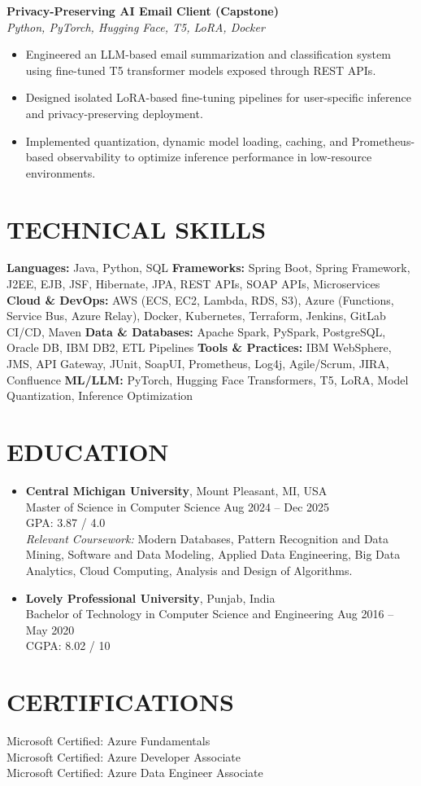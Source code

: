 \documentclass[11pt]{article}
\begin{document}
\textbf{Privacy-Preserving AI Email Client (Capstone)} \\
\textit{Python, PyTorch, Hugging Face, T5, LoRA, Docker}

\begin{itemize}
    \item Engineered an LLM-based email summarization and classification system using fine-tuned T5 transformer models exposed through REST APIs.
    \item Designed isolated LoRA-based fine-tuning pipelines for user-specific inference and privacy-preserving deployment.
    \item Implemented quantization, dynamic model loading, caching, and Prometheus-based observability to optimize inference performance in low-resource environments.
\end{itemize}

\section*{TECHNICAL SKILLS}

\textbf{Languages:} Java, Python, SQL
\textbf{Frameworks:} Spring Boot, Spring Framework, J2EE, EJB, JSF, Hibernate, JPA, REST APIs, SOAP APIs, Microservices
\textbf{Cloud \& DevOps:} AWS (ECS, EC2, Lambda, RDS, S3), Azure (Functions, Service Bus, Azure Relay), Docker, Kubernetes, Terraform, Jenkins, GitLab CI/CD, Maven
\textbf{Data \& Databases:} Apache Spark, PySpark, PostgreSQL, Oracle DB, IBM DB2, ETL Pipelines
\textbf{Tools \& Practices:} IBM WebSphere, JMS, API Gateway, JUnit, SoapUI, Prometheus, Log4j, Agile/Scrum, JIRA, Confluence
\textbf{ML/LLM:} PyTorch, Hugging Face Transformers, T5, LoRA, Model Quantization, Inference Optimization

\section*{EDUCATION}

\begin{itemize}[leftmargin=0pt, itemsep=5pt, label=]

  \item
\textbf{Central Michigan University}, Mount Pleasant, MI, USA\\
Master of Science in Computer Science \hfill Aug 2024 -- Dec 2025 \\
GPA: 3.87 / 4.0\\
\textit{Relevant Coursework:} Modern Databases, Pattern Recognition and Data Mining, Software and Data Modeling, Applied Data Engineering, Big Data Analytics, Cloud Computing, Analysis and Design of Algorithms.


\item
\textbf{Lovely Professional University}, Punjab, India \\
Bachelor of Technology in Computer Science and Engineering \hfill Aug 2016 -- May 2020 \\
CGPA: 8.02 / 10
\end{itemize}

\section*{CERTIFICATIONS}

Microsoft Certified: Azure Fundamentals \\
Microsoft Certified: Azure Developer Associate \\
Microsoft Certified: Azure Data Engineer Associate
\end{document}
